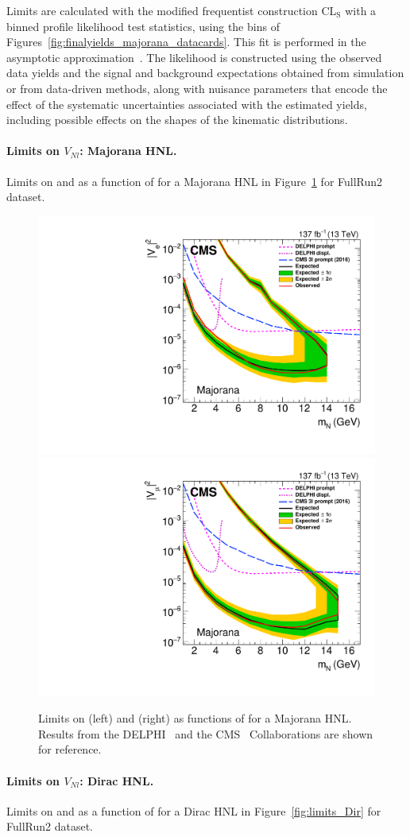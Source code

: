 Limits are calculated with the modified frequentist construction
CL$_{\mathrm{S}}$ with a binned profile likelihood
test statistics, using the bins of Figures~\ref{fig:finalyields_majorana_datacards}.
This fit is performed in the asymptotic approximation~\cite{cowan}.
The likelihood is constructed using the observed data yields and the
signal and background expectations obtained from simulation or from
data-driven methods, along with nuisance parameters that encode the
effect of the systematic uncertainties associated with the estimated
yields, including possible effects on the shapes of the kinematic
distributions.
\paragraph{Limits on $V_{Nl}$: Majorana HNL.}
Limits on \mixpare and \mixparm as a function of \mhnl for a Majorana HNL in
Figure~\ref{fig:limits_Maj} for FullRun2 dataset.
\begin{figure}[!ht]
    \centering
    \includegraphics[width=.48\textwidth]{Figures/paper/majorana_ele.pdf}
    \hfill
    \includegraphics[width=.48\textwidth]{Figures/paper/majorana_muo.pdf}
    \caption{\label{fig:limits_Maj}
        Limits on \mixpare (left) and \mixparm (right) as
        functions of \mhnl for a Majorana HNL. Results from the DELPHI~\cite{Abreu:1996pa}
        and the CMS~\cite{Sirunyan:2018mtv} Collaborations are shown for reference.
    }
\end{figure}
\paragraph{Limits on $V_{Nl}$: Dirac HNL.}
Limits on \mixpare and \mixparm as a function of \mhnl for a Dirac HNL in
Figure~\ref{fig:limits_Dir} for FullRun2 dataset.

